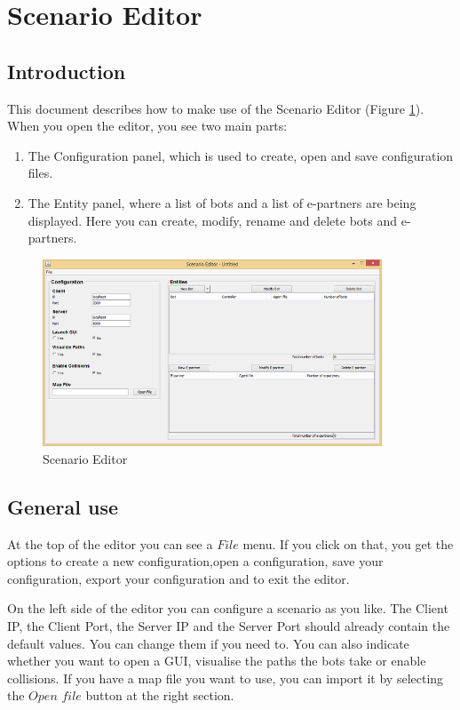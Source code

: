 \newpage
\section{Scenario Editor}


\subsection{Introduction}
This document describes how to make use of the Scenario Editor (Figure \ref{ScenarioEditor}). When you open the editor, you see two main parts:
\begin{enumerate}
\item The Configuration panel, which is used to create, open and save configuration files.
\item The Entity panel, where a list of bots and a list of e-partners are being displayed. Here you can create, modify, rename and delete bots and e-partners.
\end{enumerate}

\begin{figure}[h]
\begin{center}
\includegraphics[width=0.9\textwidth]{ScenarioEditor/editor.png}
\caption{Scenario Editor}
\label{ScenarioEditor}
\end{center}
\end{figure}

\subsection{General use}
At the top of the editor you can see a $File$ menu. If you click on that, you get the options to create a new configuration,open a configuration, save your configuration, export your configuration and to exit the editor.

On the left side of the editor you can configure a scenario as you like. The Client IP, the Client Port, the Server IP and the Server Port should already contain the default values. You can change them if you need to. You can also indicate whether you want to open a GUI, visualise the paths the bots take or enable collisions. If you have a map file you want to use, you can import it by selecting the $Open$ $file$ button at the right section.

